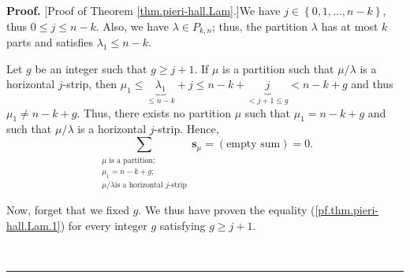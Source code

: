 \documentclass[numbers=enddot,12pt,final,onecolumn,notitlepage]{scrartcl}%
\theoremstyle{definition}
\newenvironment{proof}[1][Proof]{\noindent\textbf{#1.} }{\ \rule{0.5em}{0.5em}}
\let\sumnonlimits\sum
\renewcommand{\sum}{\sumnonlimits\limits}
\begin{document}
\begin{proof}
[Proof of Theorem \ref{thm.pieri-hall.Lam}.]We have $j\in\left\{
0,1,\ldots,n-k\right\}  $, thus $0\leq j\leq n-k$. Also, we have $\lambda\in
P_{k,n}$; thus, the partition $\lambda$ has at most $k$ parts and satisfies
$\lambda_{1}\leq n-k$.

Let $g$ be an integer such that $g\geq j+1$. If $\mu$ is a partition such that
$\mu/\lambda$ is a horizontal $j$-strip, then $\mu_{1}\leq\underbrace{\lambda
_{1}}_{\leq n-k}+j\leq n-k+\underbrace{j}_{<j+1\leq g}<n-k+g$ and thus
$\mu_{1}\neq n-k+g$. Thus, there exists no partition $\mu$ such that $\mu
_{1}=n-k+g$ and such that $\mu/\lambda$ is a horizontal $j$-strip. Hence,
\begin{equation}
\sum_{\substack{\mu\text{ is a partition;}\\\mu_{1}=n-k+g;\\\mu/\lambda\text{
is a horizontal }j\text{-strip}}}\mathbf{s}_{\mu}=\left(  \text{empty
sum}\right)  =0. \label{pf.thm.pieri-hall.Lam.1}%
\end{equation}


Now, forget that we fixed $g$. We thus have proven the equality
(\ref{pf.thm.pieri-hall.Lam.1}) for every integer $g$ satisfying $g\geq j+1$.


\end{proof}
\end{document}
